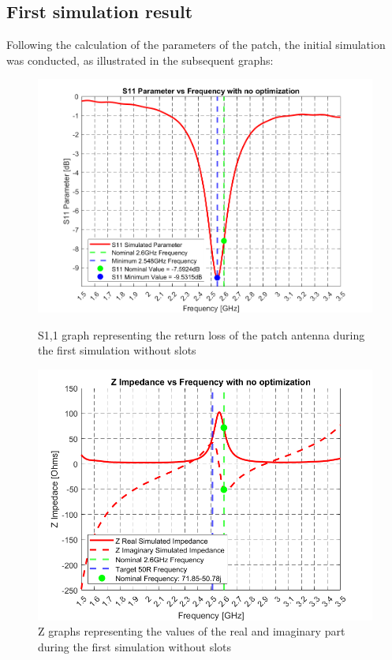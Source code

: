 \documentclass[]{article}
\begin{document}
\subsection{First simulation result}
Following the calculation of the parameters of the patch, the initial simulation was conducted, as illustrated in the subsequent graphs:\\
\begin{figure}[h]
	\centering
	\begin{minipage}{0.4\linewidth}
		\centering
		\includegraphics[width=\linewidth]{img/img7}
		\caption{S1,1 graph representing the return loss of the patch antenna during the first simulation without slots}
		\label{GSNOslot}
	\end{minipage}\hspace{0.1\linewidth}
	\begin{minipage}{0.4\linewidth}
		\centering
		\includegraphics[width=\linewidth]{img/img8}
		\caption{Z graphs representing the values of the real and imaginary part during the first simulation without slots}
		\label{GZNOslot}
	\end{minipage}
\end{figure}
\end{document}

